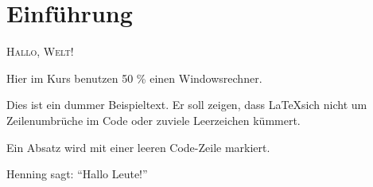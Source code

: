 \section{Einführung}
\textsc{Hallo, Welt!}

Hier im Kurs benutzen 50 \% einen Windowsrechner.

Dies ist ein dummer Beispieltext.
Er soll zeigen, dass \LaTeX  sich nicht um
Zeilenumbrüche im Code oder zuviele
Leerzeichen kümmert.

Ein Absatz wird mit einer leeren Code-Zeile markiert.

Henning sagt: \enquote{Hallo Leute!}
